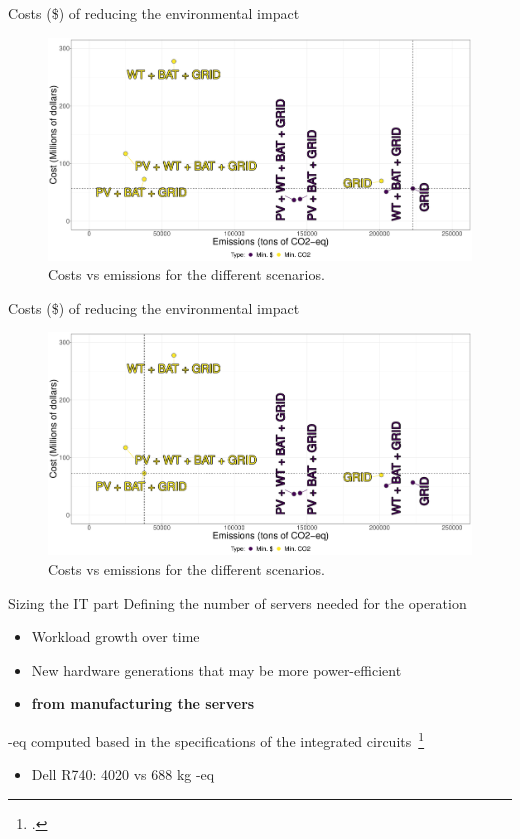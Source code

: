 \documentclass[Ligatures=TeX,table,svgnames,usetotalslideindicator,compress,10pt,aspectratio=169]{beamer}
\begin{document}
\begin{frame}{Costs (\$) of reducing the environmental impact}


\begin{figure}[h]
\centering
  \includegraphics[width=.9\textwidth]{images/costs_vs_co2_scenarios_only_grid_costs.pdf}
  \caption{Costs vs  emissions for the different scenarios.}
\end{figure}

\end{frame}
\addtocounter{framenumber}{-1}

\begin{frame}{Costs (\$) of reducing the environmental impact}


\begin{figure}[h]
\centering
  \includegraphics[width=.9\textwidth]{images/costs_vs_co2_scenarios_interesting_candidate.pdf}
  \caption{Costs vs  emissions for the different scenarios.}
\end{figure}

\end{frame}


\begin{frame}{Sizing the IT part}
Defining the number of servers needed for the operation
\begin{itemize}
    \item Workload growth over time 
    \item New hardware generations that may be more power-efficient
    \item \textbf{ from manufacturing the servers}      
\end{itemize}  

-eq computed based in the specifications of the integrated circuits~\footcite{gupta2022_ACT}  
\begin{itemize}
 \item Dell R740: 4020 vs 688 kg -eq
\end{itemize}
\end{frame}
\end{document}
